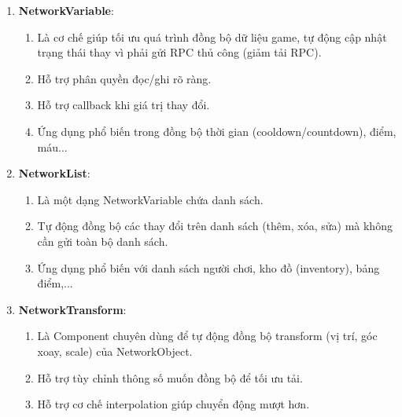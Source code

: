 \begin{enumerate}[$\bullet$]
\begin{enumerate}[-]
        Gửi từ Server đến Client
        \begin{enumerate}[+]
            \item Đặc điểm: Gửi đến mọi client hoặc một client cụ thể, thường dùng cho các sự kiện tức thời.
            \item Ứng dụng: Thông báo hiệu ứng (ví dụ như nổ, va chạm), cập nhật trạng thái (ví dụ như bắt đầu game).
        \end{enumerate}
    \end{enumerate}
    \item \textbf{NetworkVariable}:
    \begin{enumerate}[-]
        \item Là cơ chế giúp tối ưu quá trình đồng bộ dữ liệu game, tự động cập nhật trạng thái thay vì phải gửi RPC thủ công (giảm tải RPC).
        \item Hỗ trợ phân quyền đọc/ghi rõ ràng.
        \item Hỗ trợ callback khi giá trị thay đổi.
        \item Ứng dụng phổ biến trong đồng bộ thời gian (cooldown/countdown), điểm, máu...
    \end{enumerate}
    \item \textbf{NetworkList}:
    \begin{enumerate}[-]
        \item Là một dạng NetworkVariable chứa danh sách.
        \item Tự động đồng bộ các thay đổi trên danh sách (thêm, xóa, sửa) mà không cần gửi toàn bộ danh sách.
        \item Ứng dụng phổ biến với danh sách người chơi, kho đồ (inventory), bảng điểm,...
    \end{enumerate}
    \item \textbf{NetworkTransform}:
    \begin{enumerate}[-]
        \item Là Component chuyên dùng để tự động đồng bộ transform (vị trí, góc xoay, scale) của NetworkObject.
        \item Hỗ trợ tùy chỉnh thông số muốn đồng bộ để tối ưu tải.
        \item Hỗ trợ cơ chế interpolation giúp chuyển động mượt hơn.
    \end{enumerate}
\end{enumerate}
